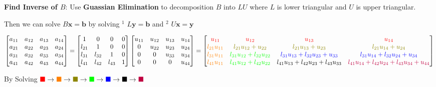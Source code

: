 \documentclass[9pt]{article}
\begin{document}
\textbf{Find Inverse of $B$}: Use \textbf{Guassian Elimination} to decomposition $B$ into $LU$ where $L$ is lower triangular and $U$ is upper triangular.

\quad Then we can solve $B\mathbf{x}=\mathbf{b}$ by solving $^1$ $L\mathbf{y}=\mathbf{b}$ and $^2$ $U\mathbf{x}=\mathbf{y}$

\vspace{-5pt}
{\scriptsize 
\[
\begin{bmatrix}
a_{11} & a_{12} & a_{13} & a_{14} \\
a_{21} & a_{22} & a_{23} & a_{24} \\
a_{31} & a_{32} & a_{33} & a_{34} \\
a_{41} & a_{42} & a_{43} & a_{44} 
\end{bmatrix}
=
\begin{bmatrix}
1 & 0 & 0 & 0 \\
l_{21} & 1 & 0 & 0 \\
l_{31} & l_{32} & 1 & 0 \\
l_{41} & l_{42} & l_{43} & 1
\end{bmatrix}
\begin{bmatrix}
u_{11} & u_{12} & u_{13} & u_{14} \\
0 & u_{22} & u_{23} & u_{24} \\
0 & 0 & u_{33} & u_{34} \\
0 & 0 & 0 & u_{44}
\end{bmatrix}
=
\begin{bmatrix}
\textcolor{red}{u_{11}} & \textcolor{red}{u_{12}} & \textcolor{red}{u_{13}} & \textcolor{red}{u_{14}} \\
\textcolor{orange}{l_{21} u_{11}} & \textcolor{olive}{l_{21} u_{12} + u_{22}} & \textcolor{olive}{l_{21} u_{13} + u_{23}} & \textcolor{olive}{l_{21} u_{14} + u_{24}} \\
\textcolor{orange}{l_{31} u_{11}} & \textcolor{green}{l_{31} u_{12} + l_{32} u_{22}} & \textcolor{blue}{l_{31} u_{13} + l_{32} u_{23} + u_{33}} & \textcolor{blue}{l_{31} u_{14} + l_{32} u_{24} + u_{34}} \\
\textcolor{orange}{l_{41} u_{11}} & \textcolor{green}{l_{41} u_{12} + l_{42} u_{22}} & \textcolor{black}{l_{41} u_{13} + l_{42} u_{23} + l_{43} u_{33}} & \textcolor{purple}{l_{41} u_{14} + l_{42} u_{24} + l_{43} u_{34} + u_{44}}
\end{bmatrix}
\]
}
\vspace{-5pt}

\quad By Solving $\textcolor{red}{\blacksquare} \to \textcolor{orange}{\blacksquare} \to \textcolor{olive}{\blacksquare} \to \textcolor{green}{\blacksquare} \to \textcolor{blue}{\blacksquare} \to \textcolor{black}{\blacksquare} \to \textcolor{purple}{\blacksquare}  $
\end{document}
